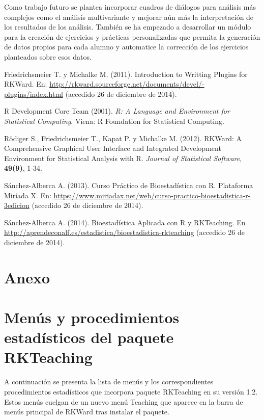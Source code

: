 \documentclass[10pt,twoside,spanish]{article}
\numberwithin{equation}{section}
\begin{document}
Como trabajo futuro se plantea incorporar cuadros de diálogos para análisis más complejos como el análisis multivariante y mejorar aún más
la interpretación de los resultados de los análisis. 
También se ha empezado a desarrollar un módulo para la creación de ejercicios y prácticas personalizadas que permita la generación de datos
propios para cada alumno y automatice la corrección de los ejercicios planteados sobre esos datos. 

\begin{thebibliography}{9}
 Friedrichsmeier T. y Michalke M. (2011). Introduction to Writting Plugins for RKWard. En:
\url{http://rkward.sourceforge.net/documents/devel/-plugins/index.html} (accedido 26 de diciembre de 2014).

 R Development Core Team (2001). \emph{R: A Language and Environment for Statistical Computing}. Viena: R Foundation for
Statistical Computing.

 Rödiger S., Friedrichsmeier T., Kapat P. y Michalke M. (2012). RKWard: A Comprehensive Graphical
User Interface and Integrated Development Environment for Statistical Analysis with R. \emph{Journal of Statistical Software},
\textbf{49(9)}, 1-34.

 Sánchez-Alberca A. (2013). Curso Práctico de Bioestadística con R. Plataforma Miríada X. En:
\url{https://www.miriadax.net/web/curso-practico-bioestadistica-r-3edicion} (accedido 26 de diciembre de 2014).

 Sánchez-Alberca A. (2014). Bioestadística Aplicada con R y RKTeaching. En
\url{http://aprendeconalf.es/estadistica/bioestadistica-rkteaching} (accedido 26 de diciembre de 2014).
\end{thebibliography}

\appendix
\section*{Anexo}

\section*{Menús y procedimientos estadísticos del paquete RKTeaching}\label{menus_rkteaching}
A continuación se presenta la lista de menús y los correspondientes procedimientos estadísticos que incorpora paquete RKTeaching en su
versión 1.2.
Estos menús cuelgan de un nuevo menú \textsf{Teaching} que aparece en la barra de menús principal de RKWard tras instalar el paquete.
\end{document}
